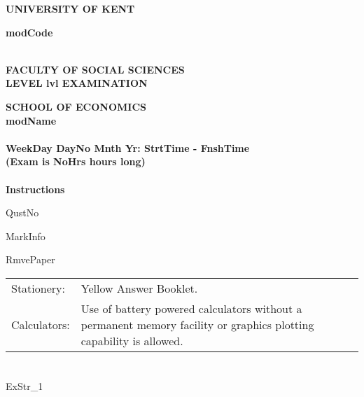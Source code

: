 \documentclass[a4paper, leqno, 12pt]{article} %
\newenvironment{top_enumerate}{
\begin{enumerate}
  \setlength{\itemsep}{2em}
  \setlength{\topsep}{-0pt}
  \setlength{\partopsep}{-0pt}
}{\end{enumerate}}
\newcommand\T{\rule{0pt}{2.6ex}}
\newcommand\B{\rule[-1.2ex]{0pt}{0pt}}
\begin{document}
\chead{}            %
\singlespacing

\begin{center}
\textbf{\large{     %
UNIVERSITY OF KENT
}}
\end{center}

\begin{flushright}
\textbf{\large{modCode}}
\end{flushright}

\doublespacing
\begin{center}
\textbf{\large{   %
\\
FACULTY OF SOCIAL SCIENCES
\\
LEVEL lvl EXAMINATION}}
\end{center}

\begin{center}
\textbf{
SCHOOL OF ECONOMICS
\\
modName
\\
\quad
\\
WeekDay DayNo Mnth Yr: StrtTime - FnshTime
\\
(Exam is NoHrs hours long)
\\
\quad
\\
Instructions}
\end{center}

\singlespacing
\noindent
QustNo

\medskip
\noindent
MarkInfo

\medskip
\noindent
RmvePaper

\bigskip
\noindent
\begin{tabular}{l L{13cm}}
\T\B  Stationery: &	Yellow Answer Booklet.\\
\T\B  Calculators: &	Use of battery powered calculators without a permanent memory facility or graphics plotting capability is allowed.\\
\end{tabular}
\newpage
\chead{\thepage}            %

\section*{}

\begin{top_enumerate}

ExStr_1

\end{top_enumerate}
\end{document}
